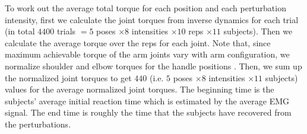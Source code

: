 To work out the average total torque for each position and each perturbation
intensity, first we calculate the joint torques from inverse dynamics for each
trial (in total $4400$ trials $= 5$ poses $\times 8$ intensities $\times 10$
reps $\times 11$ subjects).  Then we calculate the average torque over the
reps for each joint.  Note that, since maximum achievable torque of the arm
joints vary with arm configuration, we normalize shoulder and elbow torques
for the handle positions \cite{Anderson2007, Bober2002, Gandevia1998,
  Moraux2013}.  Then, we sum up the normalized joint torques to get $440$
(i.e. $5$ poses $\times 8$ intensities $\times 11$ subjects) values for the
average normalized joint torques.  The beginning time is the subjects' average
initial reaction time which is estimated by the average EMG signal.  The end
time is roughly the time that the subjects have recovered from the
perturbations.



